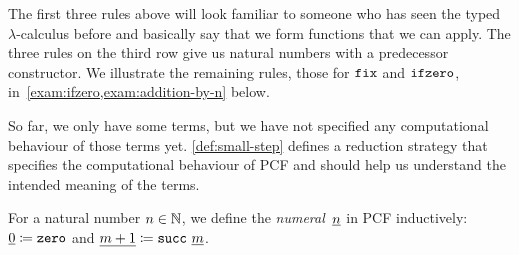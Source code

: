 The first three rules above will look familiar to someone who has seen the typed
\(\lambda\)-calculus before and basically say that we form functions that we can
apply. The three rules on the third row give us natural numbers with a
predecessor constructor.
%
We illustrate the remaining rules, those for \(\operatorname{\texttt{fix}}\) and \(\operatorname{\texttt{ifzero}}\),
in~\cref{exam:ifzero,exam:addition-by-n} below.

So far, we only have some terms, but we have not specified any computational
behaviour of those terms yet. \cref{def:small-step} defines a reduction strategy
that specifies the computational behaviour of PCF and should help us understand
the intended meaning of the terms.

\begin{definition}
  For a natural number \(n \in \mathbb N\), we define the
  \emph{numeral}~\(\underline{n}\) in PCF inductively:
  \(\underline{0} \coloneqq \texttt{zero}\) and
  \(\underline{m+1} \coloneqq \operatorname{\texttt{succ}} \, \underline{m}\).
\end{definition}

